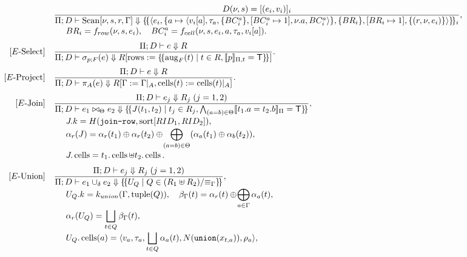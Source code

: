 \documentclass[journal,onecolumn]{IEEEtran}
\newcommand{\code}[1]{\texttt{\detokenize{#1}}}
\newcommand{\lbag}{\{\!\{}
\newcommand{\rbag}{\}\!\}}
\newcommand{\llbracket}{[\![}
\newcommand{\rrbracket}{]\!]}
\begin{document}
\begingroup\small
\begin{align*}
[E\text{-Scan}]\quad
&\frac{D(\nu,s)=[(e_i,v_i)]_i}
 {\Pi;D\vdash\operatorname{Scan}[\nu,s,r,\Gamma]\Downarrow
  \lbag\langle e_i,\{a\mapsto\langle v_i[a],\tau_a,\{BC_i^a\},[BC_i^a\mapsto1],\nu.a,BC_i^a\rangle\},
  \{BR_i\},[BR_i\mapsto1],\{(r,\nu,e_i)\}\rangle\rbag_i},\\[-1mm]
&\hspace{5mm}BR_i=f_{row}(\nu,s,e_i),\quad BC_i^a=f_{cell}(\nu,s,e_i,a,\tau_a,v_i[a]).\\[1mm]
[E\text{-Select}]\quad
&\frac{\Pi;D\vdash e\Downarrow R}
 {\Pi;D\vdash\sigma_{p;F}(e)\Downarrow
  R[\operatorname{rows}:=\lbag\operatorname{aug}_F(t)\mid t\in R,
  \llbracket p\rrbracket_{\Pi,t}=\mathsf T\rbag]}.\\[1mm]
[E\text{-Project}]\quad
&\frac{\Pi;D\vdash e\Downarrow R}
 {\Pi;D\vdash\pi_A(e)\Downarrow
  R[\Gamma:=\Gamma|_A,\operatorname{cells}(t):=\operatorname{cells}(t)|_A]}.\\[1mm]
[E\text{-Join}]\quad
&\frac{\Pi;D\vdash e_j\Downarrow R_j\;(j=1,2)}
 {\Pi;D\vdash e_1\bowtie_\Theta e_2\Downarrow
  \lbag J(t_1,t_2)\mid t_j\in R_j,
  \bigwedge_{(a=b)\in\Theta}\llbracket t_1.a=t_2.b\rrbracket_\Pi=\mathsf T\rbag},\\[-1mm]
&\hspace{5mm}J.k=H(\code{join-row},\operatorname{sort}[RID_1,RID_2]),\\[-1mm]
&\hspace{5mm}\alpha_r(J)=\alpha_r(t_1)\oplus\alpha_r(t_2)
  \oplus\!\bigoplus_{(a=b)\in\Theta}(\alpha_a(t_1)\oplus\alpha_b(t_2)),\\[-1mm]
&\hspace{5mm}J.\operatorname{cells}=t_1.\operatorname{cells}\uplus t_2.\operatorname{cells}.\\[1mm]
[E\text{-Union}]\quad
&\frac{\Pi;D\vdash e_j\Downarrow R_j\;(j=1,2)}
 {\Pi;D\vdash e_1\cup_\delta e_2\Downarrow
  \lbag U_Q\mid Q\in(R_1\uplus R_2)/{\equiv_\Gamma}\rbag},\\[-1mm]
&\hspace{5mm}U_Q.k=k_{union}(\Gamma,\operatorname{tuple}(Q)),\quad
  \beta_\Gamma(t)=\alpha_r(t)\oplus\!\bigoplus_{a\in\Gamma}\alpha_a(t),\\[-1mm]
&\hspace{5mm}\alpha_r(U_Q)=\bigsqcup_{t\in Q}\beta_\Gamma(t),\\[-1mm]
&\hspace{5mm}U_Q.\operatorname{cells}(a)=\langle v_a,\tau_a,
  \bigsqcup_{t\in Q}\alpha_a(t),N(\code{union}(x_{t,a})),\rho_a\rangle,\\[-1mm]

\end{align*}
\end{document}
